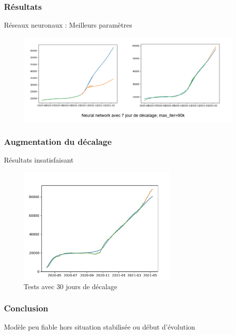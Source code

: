 \documentclass{beamer}
\begin{document}
\begin{frame}
	\frametitle{Résultats}
	Réseaux neuronaux : Meilleurs paramètres
	\begin{figure}
		\includegraphics[scale=0.6]{NN_3}
	\end{figure}
\end{frame}

\begin{frame}
	\frametitle{Augmentation du décalage}
	Résultats insatisfaisant 
	\begin{figure}
		\includegraphics[width=0.7\textwidth]{NN_2}
		\caption{Tests avec 30 jours de décalage}
	\end{figure}
\end{frame}

\begin{frame}
	\frametitle{Conclusion}
	Modèle peu fiable hors situation stabilisée ou début d'évolution
\end{frame}

\appendix
\end{document}
